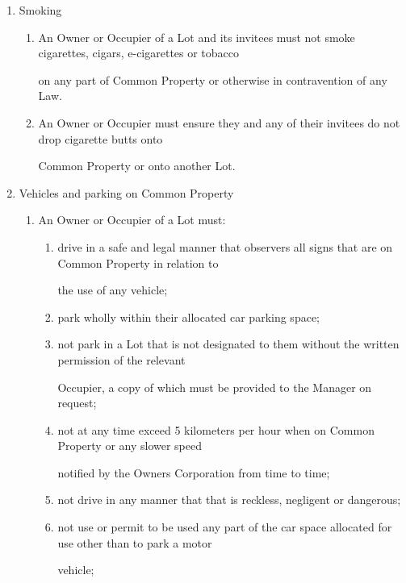 \documentclass{article}
\begin{document}
\begin{enumerate}[label=\arabic*.]
\begin{enumerate}[label=\arabic{enumi}.\arabic*.]
\begin{enumerate}[label=(\arabic*)]
\end{enumerate}
\item  Smoking 

\begin{enumerate}[label=(\arabic*)]
\item  An Owner or Occupier of a Lot and its invitees must not smoke cigarettes, cigars, e-cigarettes or tobacco 

on any part of Common Property or otherwise in contravention of any Law. 

\item  An Owner or Occupier must ensure they and any of their invitees do not drop cigarette butts onto 

Common Property or onto another Lot. 

\end{enumerate}
\item  Vehicles and parking on Common Property 

\begin{enumerate}[label=(\arabic*)]
\item  An Owner or Occupier of a Lot must: 

\begin{enumerate}[label=(\alph*)]
\item  drive in a safe and legal manner that observers all signs that are on Common Property in relation to 

the use of any vehicle; 

\item  park wholly within their allocated car parking space; 

\item  not park in a Lot that is not designated to them without the written permission of the relevant 

Occupier, a copy of which must be provided to the Manager on request; 

\item  not at any time exceed 5 kilometers per hour when on Common Property or any slower speed 

notified by the Owners Corporation from time to time; 

\item  not drive in any manner that that is reckless, negligent or dangerous; 

\item  not use or permit to be used any part of the car space allocated for use other than to park a motor 

vehicle; 


\end{enumerate}
\end{enumerate}
\end{enumerate}
\end{enumerate}
\end{document}
